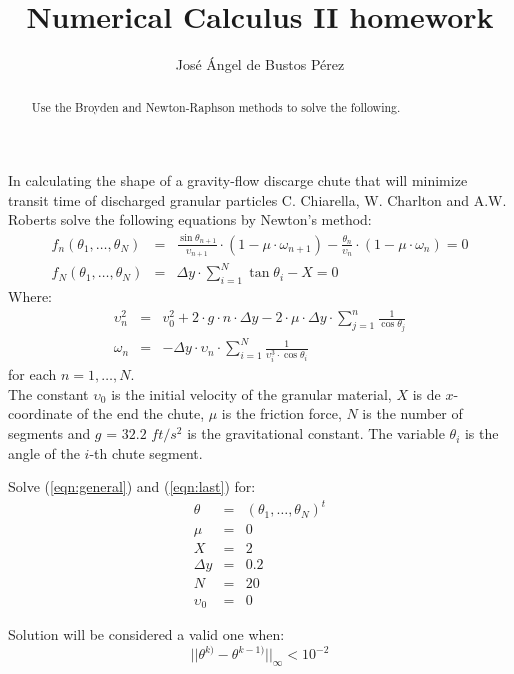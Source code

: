 \documentclass[a4paper,12pt]{article}
\begin{document}
\title{\textbf{Numerical Calculus II homework}}
\author{Jos\'e \'Angel de Bustos P\'erez}
\maketitle

\begin{abstract}
Use the Broyden and Newton-Raphson methods to solve the following.
\end{abstract}

In calculating the shape of a gravity-flow discarge chute that will minimize transit time of discharged granular particles C. Chiarella, W. Charlton and A.W. Roberts solve the following equations by Newton's method:
%
\begin{eqnarray}
  f_n(\theta_1,\dots,\theta_N) & = & \frac{\sin{\theta_{n+1}}}{\upsilon_{n+1}}\cdot (1 - \mu \cdot \omega_{n+1}) - \frac{\theta_n}{\upsilon_n} \cdot (1 - \mu \cdot \omega_n) = 0 \label{eqn:general} \\
  f_N(\theta_1,\dots,\theta_N) & = & \Delta y \cdot \sum_{i=1}^N \tan{\theta_i} - X = 0 \label{eqn:last}
\end{eqnarray}
%
Where:
%
\begin{eqnarray*}
  \upsilon_n^2 & = & v_0^2 + 2\cdot g\cdot n \cdot \Delta y - 2\cdot \mu \cdot \Delta y \cdot \sum_{j=1}^n \frac{1}{\cos{\theta_j}} \\
  \omega_n & = & -\Delta y \cdot \upsilon_n \cdot \sum_{i=1}^N \frac{1}{\upsilon_i^3 \cdot \cos{\theta_i}}
\end{eqnarray*}
%
for each $n=1,\dots,N$.\\

The constant $\upsilon_0$ is the initial velocity of the granular material, $X$ is de $x$-coordinate of the end the chute, $\mu$ is the friction force, $N$ is the number of segments and $g$ = $32.2$ $ft/s^2$ is the gravitational constant. The variable $\theta_i$ is the angle of the $i$-th chute segment.\\

\newpage

Solve (\ref{eqn:general}) and (\ref{eqn:last}) for:
%
\begin{eqnarray}
  \theta & = & (\theta_1,\dots,\theta_N)^t\\
  \mu & = & 0 \\
  X & = & 2 \\
  \Delta y & = & 0.2 \\
  N & = & 20 \\
  \upsilon_0 & = & 0
\end{eqnarray}

Solution will be considered a valid one when:
%
\begin{displaymath}
|| \theta^{k)} - \theta^{k-1)}||_{\infty} < 10^{-2}  
\end{displaymath}
%
\end{document}
